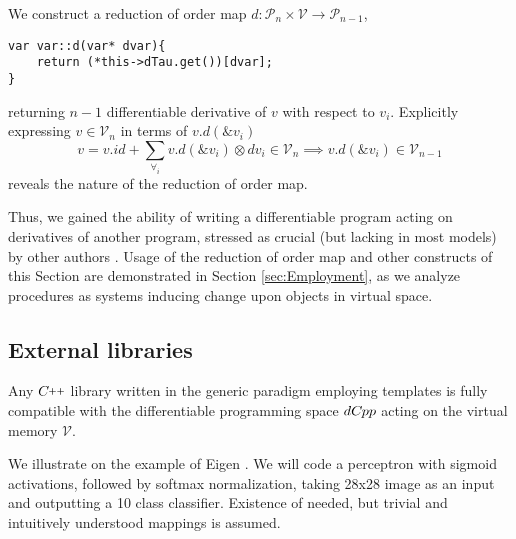 \documentclass{article}
\newcommand{\VV}{\mathcal{V}}
\newcommand{\CC}{C\nolinebreak\hspace{-.05em}\raisebox{.4ex}{\tiny\bf +}\nolinebreak\hspace{-.10em}\raisebox{.4ex}{\tiny\bf +}}
\def\CC{{C\nolinebreak[4]\hspace{-.05em}\raisebox{.4ex}{\tiny\bf ++}}}
\newcommand{\dP}{\mathcal{P}}
\newcommand{\dCpp}{dC\nolinebreak\hspace{-.05em}\raisebox{.4ex}{\tiny\bf +}\nolinebreak\hspace{-.10em}\raisebox{.4ex}{\tiny\bf p}}
\def\dCpp{{dC\nolinebreak[4]\hspace{-.05em}pp}}
\begin{document}
We construct a reduction of order map $d:\dP_n\times\VV\to\dP_{n-1}$, 

\begin{lstlisting}
var var::d(var* dvar){
    return (*this->dTau.get())[dvar];
}
\end{lstlisting}
returning $n-1$ differentiable derivative of $v$ with respect to $v_i$.
Explicitly expressing $v\in\VV_n$ in terms of $v.d(\&v_i)$
\begin{equation}
v=v.id+\sum\limits_{\forall_i}v.d(\&v_i)\otimes dv_i \in\VV_n\implies v.d(\&v_i)\in\VV_{n-1}
\end{equation}
reveals the nature of the reduction of order map.

 Thus, we gained the ability of writing a differentiable program acting on derivatives of another program, stressed as crucial (but lacking in most models) by other authors \cite{AD1}. Usage of the reduction of order map and other constructs of
 this Section are demonstrated in Section \ref{sec:Employment}, as we analyze procedures as systems inducing change upon objects in virtual space. 

\subsection{External libraries}\label{sec:external}

Any $\CC$ library written in the generic paradigm employing templates is fully compatible with the differentiable programming space $\dCpp$ acting on the virtual memory $\VV$. 

We illustrate on the example of Eigen \cite{Eigen}. We will code a perceptron with sigmoid activations, followed by softmax normalization, taking 28x28 image as an input and outputting a 10 class classifier. Existence of needed, but trivial and intuitively understood mappings is assumed. 
\end{document}
